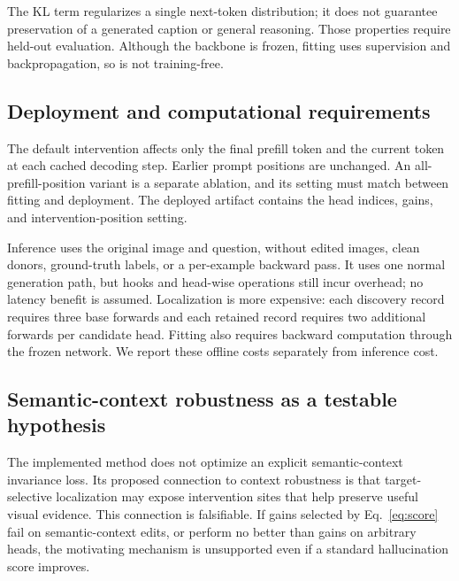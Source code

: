 The KL term regularizes a single next-token distribution; it does not
guarantee preservation of a generated caption or general reasoning.
Those properties require held-out evaluation. Although the backbone is
frozen, fitting uses supervision and backpropagation, so \method is not
training-free.

\subsection{Deployment and computational requirements}
The default intervention affects only the final prefill token and the
current token at each cached decoding step. Earlier prompt positions are
unchanged. An all-prefill-position variant is a separate ablation, and its
setting must match between fitting and deployment. The deployed artifact
contains the head indices, gains, and intervention-position setting.

Inference uses the original image and question, without edited images,
clean donors, ground-truth labels, or a per-example backward pass. It uses
one normal generation path, but hooks and head-wise operations still incur
overhead; no latency benefit is assumed. Localization is more expensive:
each discovery record requires three base forwards and each retained
record requires two additional forwards per candidate head. Fitting also
requires backward computation through the frozen network. We report these
offline costs separately from inference cost.

\subsection{Semantic-context robustness as a testable hypothesis}
The implemented method does not optimize an explicit semantic-context
invariance loss. Its proposed connection to context robustness is that
target-selective localization may expose intervention sites that help
preserve useful visual evidence. This connection is falsifiable. If gains
selected by Eq.~\eqref{eq:score} fail on semantic-context edits, or perform
no better than gains on arbitrary heads, the motivating mechanism is
unsupported even if a standard hallucination score improves.
